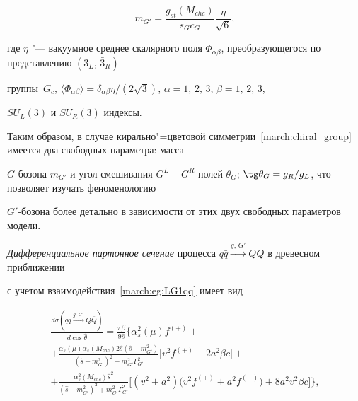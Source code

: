 \begin{equation}

m_{G'} = \frac{g_{st}(M_{chc})}{s_G c_G} \frac{\eta}{\sqrt{6}}, \label{march:eq:MG1}

\end{equation}

где $\eta$ "--- вакуумное среднее скалярного поля  $\Phi_{\alpha \beta}$, преобразующегося по представлению $(3_L,\,\bar{3}_R)$

группы~$G_c$, $\langle \Phi_{\alpha \beta} \rangle =  \delta_{\alpha \beta} \eta /(2 \sqrt{3})$, $\alpha=1,\,2,\,3$, $\beta = 1,\,2,\,3$,

$SU_L(3)$ и $SU_R(3)$ индексы.



Таким образом, в случае кирально"=цветовой симметрии~\eqref{march:chiral_group} имеется два свободных параметра: масса

$G$-бозона $m_{G'}$ и угол смешивания $G^{L} {-} G^{R}$-полей $\theta_G$; $\tg \theta_G=g_R/g_L$,  что позволяет изучать феноменологию

$G'$-бозона более детально в зависимости от этих двух свободных параметров модели.



\textit{Дифференциальное партонное сечение}  процесса $q \bar{q}  \stackrel{g,\,G'}{\rightarrow} Q \bar{Q}$ в древесном при\-бли\-же\-нии

с учетом взаимодействия~\eqref{march:eg:LG1qq} имеет вид~\cite{Martynov:2010ed}

\begin{multline}

\label{march:diffsect} \frac{d \sigma(q\bar{q} \stackrel{g,\,G'}{\rightarrow} Q \bar{Q}) }{d\cos \hat{\theta}} =  \frac{\pi

\beta}{9\hat{s}} \bigg \lbrace \alpha_s^2(\mu) f^{(+)} + \\

 +\frac{\alpha_s(\mu) \alpha_s(M_{chc})  2 \hat{s} (\hat{s}-m_{G'}^2)}

{(\hat{s}-m_{G'}^2)^2+m_{G'}^2 \Gamma_{G'}^2}  \Big[ v^2 f^{(+)} + 2 a^2 \beta c \Big] + \\ 

+\frac{\alpha_s^2(M_{chc}) \hat{s}^2} {(\hat{s}-m_{G'}^2)^2+m_{G'}^2

\Gamma_{G'}^2}  \Big[ (v^2 + a^2) \bigl( v^2 f^{(+)}+ a^2 f^{(-)} \bigr) + 8 a^2v^2 \beta c \Big] \bigg \rbrace,

\end{multline}

